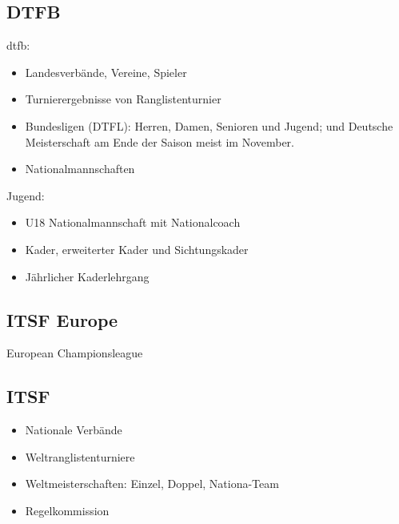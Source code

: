 \subsection{DTFB}

\gls{dtfb}:
\begin{itemize}
\item Landesverbände, Vereine, Spieler
\item Turnierergebnisse von Ranglistenturnier 
\item Bundesligen (DTFL): Herren, Damen, Senioren und Jugend; und Deutsche Meisterschaft am Ende der Saison meist im November.
\item Nationalmannschaften
\end{itemize}

Jugend:
\begin{itemize}
\item U18 Nationalmannschaft mit Nationalcoach
\item Kader, erweiterter Kader und Sichtungskader
\item Jährlicher Kaderlehrgang
\end{itemize}

\subsection{ITSF Europe}

European Championsleague

\subsection{ITSF}

\begin{itemize}
\item Nationale Verbände
\item Weltranglistenturniere
\item Weltmeisterschaften: Einzel, Doppel, Nationa-Team
\item Regelkommission
\end{itemize}

